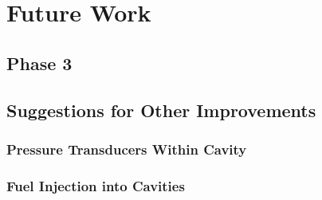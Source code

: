 
\chapter{Future Work} %

\label{Chapter6} %



\section{Phase 3}





\section{Suggestions for Other Improvements}


\subsection{Pressure Transducers Within Cavity}

\subsection{Fuel Injection into Cavities}




\newpage
